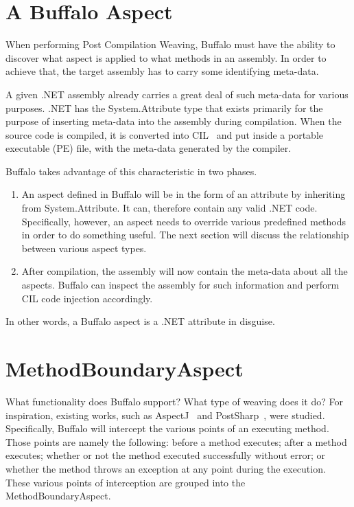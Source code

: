 \section{A Buffalo Aspect}

When performing Post Compilation Weaving, Buffalo must have the ability to discover what aspect is applied to what methods in an assembly. In order to achieve that, the target assembly has to carry some identifying meta-data.

A given .NET assembly already carries a great deal of such meta-data for various purposes. .NET has the System.Attribute type that exists primarily for the purpose of inserting meta-data into the assembly during compilation. When the source code is compiled, it is converted into CIL~\cite{msil_text} and put inside a portable executable (PE) file, with the meta-data generated by the compiler. 

Buffalo takes advantage of this characteristic in two phases.
\begin{enumerate}
	\item An aspect defined in Buffalo will be in the form of an attribute by inheriting from System.Attribute. It can, therefore contain any valid .NET code. Specifically, however, an aspect needs to override various predefined methods in order to do something useful. The next section will discuss the relationship between various aspect types.
	\item After compilation, the assembly will now contain the meta-data about all the aspects. Buffalo can inspect the assembly for such information and perform CIL code injection accordingly.
\end{enumerate}

In other words, a Buffalo aspect is a .NET attribute in disguise.

\section{MethodBoundaryAspect}
What functionality does Buffalo support? What type of weaving does it do? For inspiration, existing works, such as AspectJ~\cite{aspectj_faq} and PostSharp~\cite{postsharp}, were studied. Specifically, Buffalo will intercept the various points of an executing method. Those points are namely the following: before a method executes; after a method executes; whether or not the method executed successfully without error; or whether the method throws an exception at any point during the execution. These various points of interception are grouped into the MethodBoundaryAspect.

